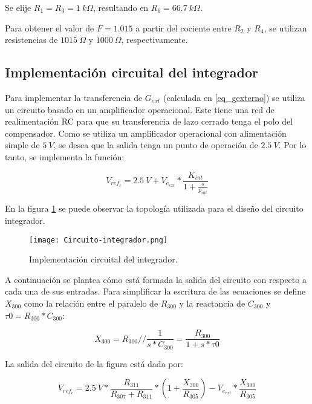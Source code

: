 Se elije $R_1=R_3=1\:k\Omega$, resultando en $R_6=66.7\:k\Omega$.

Para obtener el valor de $F=1.015$ a partir del cociente entre  $R_2$  y $R_4$, se utilizan resistencias de $1015\:\Omega$ y $1000\:\Omega$, respectivamente.

\subsection{Implementación circuital del integrador}

Para implementar la transferencia de $G_{ext}$ (calculada en \ref{eq_gexterno}) se utiliza un circuito basado en un amplificador operacional. Este tiene una red de realimentación RC para que su transferencia de lazo cerrado tenga el polo del compensador. Como se utiliza un amplificador operacional con alimentación simple de $5\:V$, se desea que la salida tenga un punto de operación de $2.5\:V$. Por lo tanto, se implementa la función:

\begin{equation}
	V_{ref_c}=2.5\:V+V_{e_{ext}}*\frac{K_{int}}{1+\frac{s}{p_{int}}}
\end{equation}

\noindent En la figura \ref{fig:circuito-integrador} se puede observar la topología utilizada para el diseño del circuito integrador.

\begin{figure}[H]
	\centering
	\texttt{[image: Circuito-integrador.png]}
	\caption{Implementación circuital del integrador.}
	\label{fig:circuito-integrador}
\end{figure}

A continuación se plantea cómo está formada la salida del circuito con respecto a cada una de sus entradas. Para simplificar la escritura de las ecuaciones se define $X_{300}$ como la relación entre el paralelo de $R_{300}$ y la reactancia de $C_{300}$ y $\tau 0 = R_{300}*C_{300}$:

\begin{equation}
	X_{300} = R_{300} // \frac{1}{s*C_{300}} = \frac{R_{300}}{1+s*\tau 0}
\end{equation}

La salida del circuito de la figura está dada por:

\begin{equation} \label{eq_salida_integrador}
	V_{ref_c}=2.5\:V*\frac{R_{311}}{R_{307}+R_{311}}*(1+\frac{X_{300}}{R_{305}})-V_{e_{ext}}*\frac{X_{300}}{R_{305}}
\end{equation}


